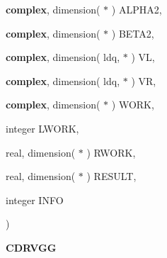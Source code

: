 {\begin{DoxyParamCaption}
\item[{{\bf complex}, dimension( $\ast$ )}]{A\+L\+P\+H\+A2, }
\item[{{\bf complex}, dimension( $\ast$ )}]{B\+E\+T\+A2, }
\item[{{\bf complex}, dimension( ldq, $\ast$ )}]{V\+L, }
\item[{{\bf complex}, dimension( ldq, $\ast$ )}]{V\+R, }
\item[{{\bf complex}, dimension( $\ast$ )}]{W\+O\+R\+K, }
\item[{integer}]{L\+W\+O\+R\+K, }
\item[{real, dimension( $\ast$ )}]{R\+W\+O\+R\+K, }
\item[{real, dimension( $\ast$ )}]{R\+E\+S\+U\+L\+T, }
\item[{integer}]{I\+N\+F\+O}
\end{DoxyParamCaption}
)}\label{group__complex__eig_ga6d4d21e3f556cbcb6998be9aeede7151}


{\bfseries C\+D\+R\+V\+G\+G} 


